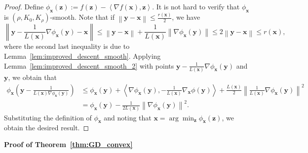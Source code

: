 \documentclass{article}
\newcommand{\Norm}[1]{\left\|#1\right\|}
\newcommand{\dotprod}[2]{\left\langle#1,#2\right\rangle}
\newcommand{\Kr}{K_{\rho}}
\newcommand{\paren}[1]{\left( #1 \right)}
\newcommand{\bx}{\mathbf{x}}
\newcommand{\by}{\mathbf{y}}
\newcommand{\bz}{\mathbf{z}}
\begin{document}
\begin{proof}
    Define $\phi_{\bx}(\bz):=f(\bz)-\dotprod{\nabla f(\bx)}{\bz}$.
    It is not hard to verify that $\phi_{\bx}$ is $\paren{\rho,K_0,\Kr}$-smooth. Note that if $\Norm{\by-\bx}\leq \frac{r(\bx)}{2}$, we have
    $$\Norm{\by-\frac{1}{L(\bx)}\nabla\phi_{\bx}(\by)-\bx}\leq \Norm{\by-\bx}+\frac{1}{L(\bx)}\Norm{\nabla \phi_{\bx}(\by)}\leq 2\Norm{\by-\bx}\leq r(\bx),$$
    where the second last inequality is due to Lemma~\ref{lem:improved_descent_smooth}.
    Applying Lemma~\ref{lem:improved_descent_smooth_2} with points $\by-\frac{1}{L(\bx)}\nabla \phi_{\bx}(\by)$ and $\by$, we obtain that
    \begin{align*}
        \phi_{\bx}\paren{\by-\frac{1}{L(\bx)\nabla\phi_{\bx}(\by)}}&\leq \phi_{\bx}(\by)+\dotprod{\nabla \phi_{\bx}(\by)}{-\frac{1}{L(\bx)}\nabla_{\bx}\phi(\by)}+\frac{L(\bx)}{2}\Norm{\frac{1}{L(\bx)}\nabla\phi_{\bx}(\by)}^2\\
        &=\phi_{\bx}(\by)-\frac{1}{2L(\bx)}\Norm{\nabla \phi_{\bx}(\by)}^2.
    \end{align*}
    Substituting the definition of $\phi_{\bx}$ and noting that $\bx=\arg\min_{\bz}\phi_{\bx}(\bz)$, we obtain the desired result.

\end{proof}


\textbf{Proof of Theorem~\ref{thm:GD_convex}}
\end{document}
